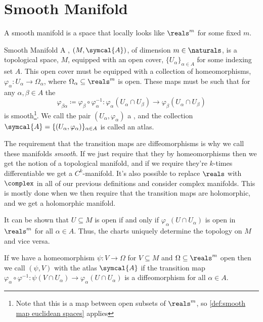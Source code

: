 \documentclass[fleqn]{NotesClass}
\newcommand{\atlas}{\symcal{A}}
\begin{document}
    \section{Smooth Manifold}
    A smooth manifold is a space that locally looks like \(\reals^m\) for some fixed \(m\).
    
    \begin{dfn}{Smooth Manifold}{}
        A , \((M, \atlas)\), of dimension \(m \in \naturals\), is a topological space, \(M\), equipped with an open cover, \(\{U_\alpha\}_{\alpha \in A}\) for some indexing set \(A\).
        This open cover must be equipped with a collection of homeomorphisms, \(\varphi_\alpha \colon U_\alpha \to \Omega_{\alpha}\), where \(\Omega_\alpha \subseteq \reals^m\) is open.
        These maps must be such that for any \(\alpha, \beta \in A\) the 
        \begin{equation}
            \varphi_{\beta \alpha} \coloneq \varphi_\beta \circ \varphi_\alpha^{-1} \colon \varphi_\alpha(U_\alpha \cap U_\beta) \to \varphi_\beta(U_\alpha \cap U_\beta)
        \end{equation}
        is smooth\footnote{Note that this is a map between open subsets of \(\reals^m\), so \cref{def:smooth map euclidean spaces} applies}.
        We call the pair \((U_\alpha, \varphi_\alpha)\) a , and the collection \(\atlas = \{(U_\alpha, \varphi_\alpha)\}_{\alpha \in A}\) is called an atlas.
    \end{dfn}
    
    The requirement that the transition maps are diffeomorphisms is why we call these manifolds \emph{smooth}.
    If we just require that they by homeomorphisms then we get the notion of a topological manifold, and if we require they're \(k\)-times differentiable we get a \(C^k\)-manifold.
    It's also possible to replace \(\reals\) with \(\complex\) in all of our previous definitions and consider complex manifolds.
    This is mostly done when we then require that the transition maps are holomorphic, and we get a holomorphic manifold.
    
    It can be shown that \(U \subseteq M\) is open if and only if \(\varphi_\alpha(U \cap U_\alpha)\) is open in \(\reals^m\) for all \(\alpha \in A\).
    Thus, the charts uniquely determine the topology on \(M\) and vice versa.
    
    If we have a homeomorphism \(\psi \colon V \to \Omega\) for \(V \subseteq M\) and \(\Omega \subseteq \reals^m\) open then we call \((\psi, V)\)  with the atlas \(\atlas\) if the transition map \(\varphi_\alpha \circ \varphi^{-1} \colon \psi(V \cap U_\alpha) \to \varphi_\alpha(U \cap U_\alpha)\) is a diffeomorphism for all \(\alpha \in A\).
    
\end{document}
